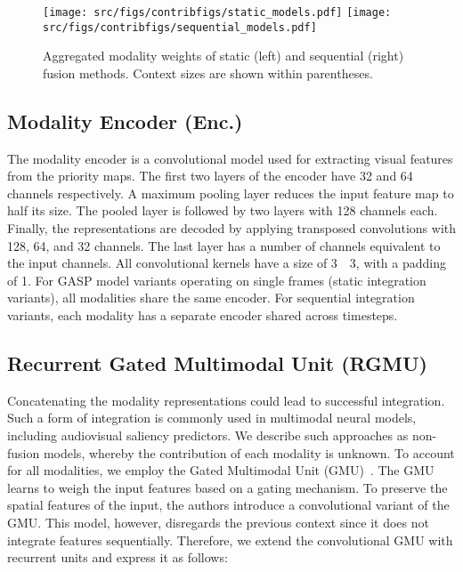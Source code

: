 \documentclass{article}
\begin{document}
\begin{figure*}[ht]
\centering

{\texttt{[image: src/figs/contribfigs/static\_models.pdf]}
\label{cat}}
{\texttt{[image: src/figs/contribfigs/sequential\_models.pdf]}
\label{bat}}





\caption{Aggregated modality weights of static (left) and sequential (right) fusion methods. Context sizes are shown within parentheses.}
\label{fig:combchart}
\end{figure*}

\subsection{Modality Encoder (Enc.)}
The modality encoder is a convolutional model used for extracting visual features from the priority maps. 
The first two layers of the encoder have 32 and 64 channels respectively. A maximum pooling layer reduces the input feature map to half its size. The pooled layer is followed by two layers with 128 channels each. Finally, the representations are decoded by applying transposed convolutions with 128, 64, and 32 channels. The last layer has a number of channels equivalent to the input channels. All convolutional kernels have a size of 3~~3, with a padding of 1. For GASP model variants operating on single frames (static integration variants), all modalities share the same encoder. For sequential integration variants, each modality has a separate encoder shared across timesteps.


\subsection{Recurrent Gated Multimodal Unit (RGMU)}

Concatenating the modality representations could lead to successful integration. Such a form of integration is commonly used in multimodal neural models, including audiovisual saliency predictors. We describe such approaches as non-fusion models, whereby the contribution of each modality is unknown. To account for all modalities, we employ the Gated Multimodal Unit (GMU)~\cite{arevalo2020gated}. The GMU learns to weigh the input features based on a gating mechanism.
To preserve the spatial features of the input, the authors introduce a convolutional variant of the GMU. This model, however, disregards the previous context since it does not integrate features sequentially. 
Therefore, we extend the convolutional GMU with recurrent units and express it as follows: 
\end{document}
